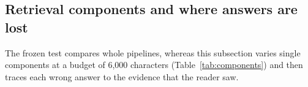\subsection{Retrieval components and where answers are lost}
\label{sec:components}
\label{sec:lost}
The frozen test compares whole pipelines, whereas this subsection varies single components at a budget of 6,000 characters (Table~\ref{tab:components}) and then traces each wrong answer to the evidence that the reader saw.


